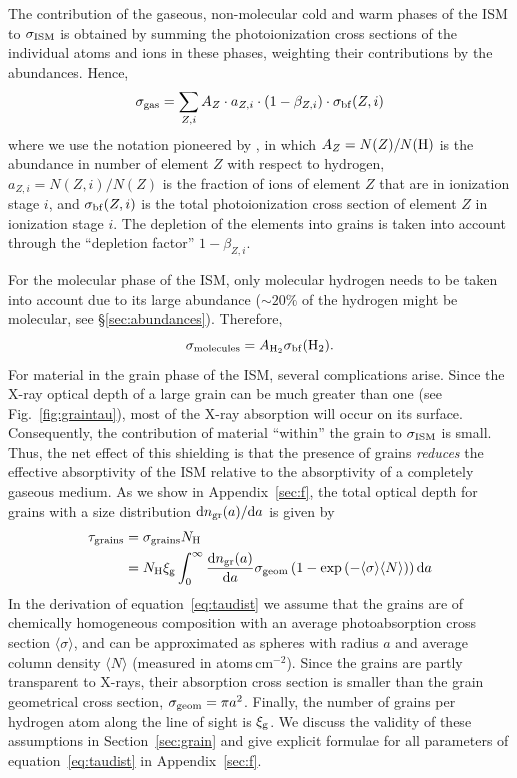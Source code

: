 \documentclass{aastex}
\newcommand{\sbf}{\ensuremath{\sigma_{\rm bf}}}
\newcommand{\avg}[1]{\ensuremath{\langle #1 \rangle}}
\newcommand{\sigism}{\ensuremath{\sigma_{\rm ISM}}}
\newcommand{\Nbar}{\ensuremath{\avg{N}}}
\newcommand{\sigbar}{\ensuremath{\avg{\sigma}}}
\newcommand{\dd}{\ensuremath{{\rm d}}}
\begin{document}
The contribution of the gaseous, non-molecular cold and warm
phases of the ISM to $\sigism$ is obtained by summing the
photoionization cross sections of the individual atoms and ions
in these phases, weighting their contributions by the abundances.
Hence,
\begin{equation}
\sigma_{\rm gas} =  \sum_{Z,i} A_Z \cdot a_{Z,i} \cdot
(1-\beta_{Z,i}) \cdot \sbf(Z,i) 
\end{equation}
where we use the notation pioneered by \citet{ride:77a}, in which 
$A_Z=N(Z)/N({\rm H})$ is the abundance in number of element $Z$
with respect to hydrogen, $a_{Z,i}=N(Z,i)/N(Z)$ is the fraction
of ions of element $Z$ that are in ionization stage $i$, and
$\sbf(Z,i)$ is the total photoionization cross section of element
$Z$ in ionization stage $i$. The depletion of the elements into
grains is taken into account through the ``depletion factor''
$1-\beta_{Z,i}$.



For the molecular phase of the ISM, only molecular hydrogen needs
to be taken into account due to its large abundance ($\sim 20\%$
of the hydrogen might be molecular, see \S\ref{sec:abundances}).
Therefore,
\begin{equation}
\sigma_{\rm molecules}= A_{\rm H_2} \sbf({\rm H_2}).
\end{equation}
For material in the grain phase of the ISM, several complications
arise.  Since the X-ray optical depth of a large grain can be
much greater than one (see Fig.~\ref{fig:graintau}), most of the
X-ray absorption will occur on its surface.  Consequently, the
contribution of material ``within'' the grain to $\sigism$ is
small.  Thus, the net effect of this
shielding is that the presence of grains \emph{reduces} the
effective absorptivity of the ISM relative to the absorptivity of
a completely gaseous medium.  As we show in Appendix~\ref{sec:f},
the total optical depth for grains with a size distribution $\dd
n_{\rm gr}(a)/\dd a$ is given by
\begin{equation}\label{eq:taudist}
\begin{split}
\tau_{\rm grains} &=\sigma_{\rm grains} N_{\rm H} \\
    &=N_{\rm H} \xi_{\rm g}  
  \int_0^\infty \frac{\dd n_{\rm gr}(a)}{\dd a}  \sigma_{\rm geom} 
  \left(1-\exp\left(-\sigbar \Nbar\right)\right)
\dd a
\end{split}
\end{equation}
In the derivation of equation~\eqref{eq:taudist} we assume that the
grains are of chemically homogeneous composition with an average
photoabsorption cross section $\sigbar$, and can be approximated as
spheres with radius $a$ and average column density $\Nbar$ (measured
in atoms\,cm$^{-2}$). Since the grains are partly transparent to
X-rays, their absorption cross section is smaller than the grain
geometrical cross section, $\sigma_{\rm geom}=\pi a^2$.  Finally, the
number of grains per hydrogen atom along the line of sight is
$\xi_{\rm g}$. We discuss the validity of these assumptions in
Section~\ref{sec:grain} and give explicit formulae for all parameters
of equation~\eqref{eq:taudist} in Appendix~\ref{sec:f}.
\end{document}
